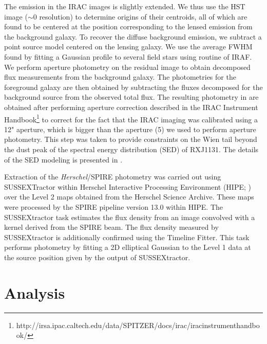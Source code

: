\documentclass[]{emulateapj}
\begin{document}
The emission in the IRAC images is slightly extended. We thus use the
HST image ($\sim$0 resolution) to determine
origins of their centroids, all of which are found to be
centered at the position corresponding to the lensed emission from the
background galaxy. To recover the diffuse background emission, we subtract a
point source model centered on the lensing galaxy. We use the average
FWHM found by fitting a Gaussian profile to several field stars
using  routine of IRAF.
We perform aperture photometry on the residual image
to obtain decomposed flux measurements from the background galaxy.
The photometries for the foreground galaxy are then obtained
by subtracting the fluxes decomposed for the background source
from the observed total flux. The resulting photometry in
 are obtained after performing aperture correction
described in the IRAC Instrument Handbook\footnote{http://irsa.ipac.caltech.edu/data/SPITZER/docs/irac/iracinstrumenthandbook/} to
correct for the fact that the IRAC imaging was calibrated
using a 12" aperture, which is bigger than the aperture (5) we used to
perform aperture photometry. This step was taken to provide
constraints on the Wien tail beyond the dust peak of the
spectral energy distribution (SED) of RXJ1131.
The details of the SED modeling is presented in .

Extraction of the {\it Herschel}/SPIRE photometry was
carried out using SUSSEXTractor within Herschel Interactive
Processing Environment (HIPE; \citealt{Ott10a})
over the Level 2 maps obtained from the Herschel Science Archive.
These maps were processed by the SPIRE pipeline
version 13.0 within HIPE. The SUSSEXtractor task estimates
the flux density from an image convolved with a kernel
derived from the SPIRE beam. The flux density
measured by SUSSEXtractor is additionally confirmed
using the Timeline Fitter. This task performs photometry
by fitting a 2D elliptical Gaussian to the Level 1 data at the
source position given by the output of SUSSEXtractor.



\section{Analysis}
\end{document}
